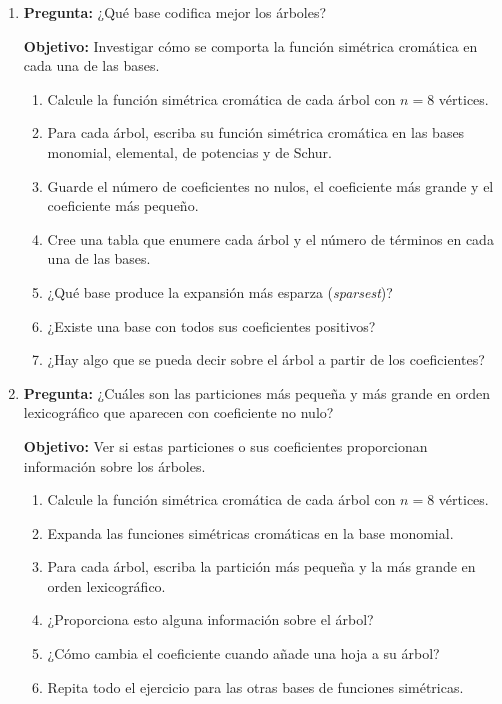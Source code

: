 \documentclass{article}
\begin{document}
\begin{enumerate}
\item[A.]
{\bf Pregunta:} ¿Qué base codifica mejor los árboles?

{\bf Objetivo:} Investigar cómo se comporta la función simétrica cromática en cada una de las bases.
\begin{enumerate}
\item Calcule la función simétrica cromática de cada árbol con $n=8$ vértices.
\item Para cada árbol, escriba su función simétrica cromática en las bases monomial, elemental, de potencias y de Schur.
\item Guarde el número de coeficientes no nulos, el coeficiente más grande y el coeficiente más pequeño.
\item Cree una tabla que enumere cada árbol y el número de términos en cada una de las bases.
\item ¿Qué base produce la expansión más esparza (\emph{sparsest})?
\item ¿Existe una base con todos sus coeficientes positivos?
\item ¿Hay algo que se pueda decir sobre el árbol a partir de los coeficientes?
\end{enumerate}
\item[B.] {\bf Pregunta:} ¿Cuáles son las particiones más pequeña y más grande en orden lexicográfico que aparecen con coeficiente no nulo?

{\bf Objetivo:} Ver si estas particiones o sus coeficientes proporcionan información sobre los árboles.
\begin{enumerate}
\item Calcule la función simétrica cromática de cada árbol con $n=8$ vértices.
\item Expanda las funciones simétricas cromáticas en la base monomial.
\item Para cada árbol, escriba la partición más pequeña y la más grande en orden lexicográfico.
\item ¿Proporciona esto alguna información sobre el árbol?
\item ¿Cómo cambia el coeficiente cuando añade una hoja a su árbol?
\item Repita todo el ejercicio para las otras bases de funciones simétricas.
\end{enumerate}
\end{enumerate}
\end{document}
